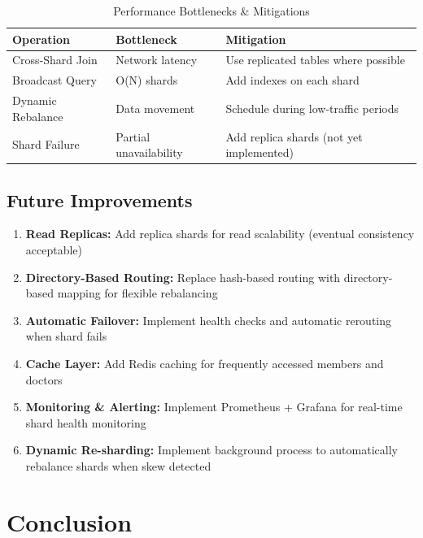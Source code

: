 \documentclass[12pt,a4paper]{article}
\begin{document}
\begin{table}[H]
\centering
\begin{tabularx}{\textwidth}{|l|X|X|}
\hline
\textbf{Operation} & \textbf{Bottleneck} & \textbf{Mitigation} \\
\hline
Cross-Shard Join & Network latency & Use replicated tables where possible \\
Broadcast Query & O(N) shards & Add indexes on each shard \\
Dynamic Rebalance & Data movement & Schedule during low-traffic periods \\
Shard Failure & Partial unavailability & Add replica shards (not yet implemented) \\
\hline
\end{tabularx}
\caption{Performance Bottlenecks \& Mitigations}
\end{table}

\subsection{Future Improvements}

\begin{enumerate}
    \item \textbf{Read Replicas:} Add replica shards for read scalability (eventual consistency acceptable)
    
    \item \textbf{Directory-Based Routing:} Replace hash-based routing with directory-based mapping for flexible rebalancing
    
    \item \textbf{Automatic Failover:} Implement health checks and automatic rerouting when shard fails
    
    \item \textbf{Cache Layer:} Add Redis caching for frequently accessed members and doctors
    
    \item \textbf{Monitoring \& Alerting:} Implement Prometheus + Grafana for real-time shard health monitoring
    
    \item \textbf{Dynamic Re-sharding:} Implement background process to automatically rebalance shards when skew detected
\end{enumerate}

\section{Conclusion}
\end{document}

